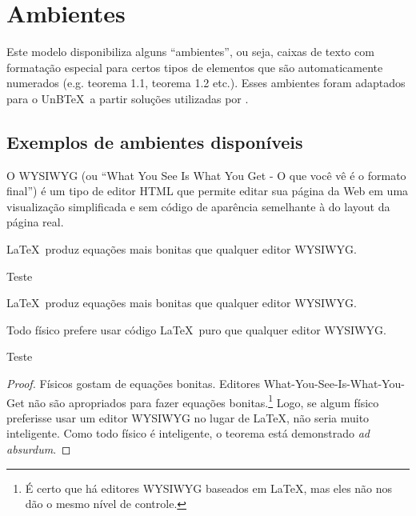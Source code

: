 \chapter{Ambientes}

Este modelo disponibiliza alguns ``ambientes'', ou seja, caixas de texto com formatação especial para certos tipos de elementos que são automaticamente numerados (e.g. teorema 1.1, teorema 1.2 etc.). Esses ambientes foram adaptados para o UnB\TeX\ a partir soluções utilizadas por \textcite{Castro2019}.

\section{Exemplos de ambientes disponíveis}


\begin{definition}
O WYSIWYG (ou ``What You See Is What You Get - O que você vê é o formato final'') é um tipo de editor HTML que permite editar sua página da Web em uma visualização simplificada e sem código de aparência semelhante à do layout da página real.
\end{definition}

\begin{proposition}
    \LaTeX\ produz equações mais bonitas que qualquer editor WYSIWYG.
\end{proposition}

\begin{lemma}
    Teste
\end{lemma}

\begin{remark}
    \LaTeX\ produz equações mais bonitas que qualquer editor WYSIWYG.
\end{remark}

\begin{theorem}\label{thm:WYSIWYG}
    Todo físico prefere usar código \LaTeX\ puro que qualquer editor WYSIWYG.
\end{theorem}

\begin{corollary}
    Teste
\end{corollary}

\begin{proof}
    Físicos gostam de equações bonitas. Editores What-You-See-Is-What-You-Get não são apropriados para fazer equações bonitas.\footnote{É certo que há editores WYSIWYG baseados em \LaTeX, mas eles não nos dão o mesmo nível de controle.} Logo, se algum físico preferisse usar um editor WYSIWYG no lugar de \LaTeX, não seria muito inteligente. Como todo físico é inteligente, o teorema está demonstrado \textit{ad absurdum}.
\end{proof}

